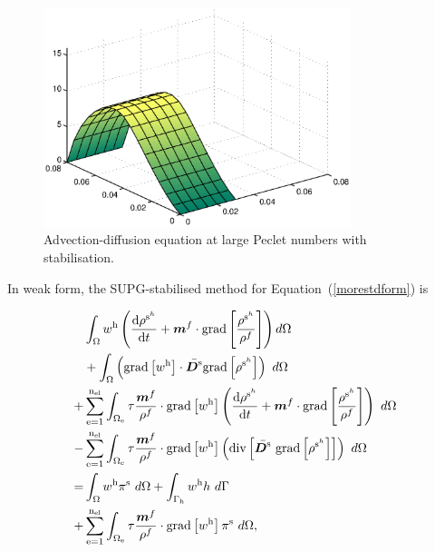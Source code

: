 \begin{figure}
\centering
\includegraphics[width=0.8\textwidth]
                {images/elucidation/stable-advection.eps}
\caption{Advection-diffusion equation at large Peclet numbers with
  stabilisation.}
\label{ustable-solution}
\end{figure}


In weak form, the SUPG-stabilised method for
Equation~(\ref{morestdform}) is

\begin{equation}
\begin{split}
&\int_{\Omega} w^{\mathrm{h}} \left(
  \frac{\mathrm{d}\rho^{\mathrm{s}^{h}}}{\mathrm{d}t} +
  \mbox{\boldmath$ m$}^f\cdot\mathrm{grad}\left[\frac{
      \rho^{\mathrm{s}^{h}}}{\rho^f}\right] \right)
  d\Omega\\ &+\int_{\Omega} \left( \mathrm{grad}
  \left[w^{\mathrm{h}}\right] \cdot \bar{\mbox{\boldmath$ D$}^\mathrm{s}} \mathrm{grad}
  \left[ \rho^{\mathrm{s}^{h}}\right] \right)\ d\Omega\\ +&
  \sum_{\mathrm{e}=1}^{\mathrm{n_{el}}} \int_{\Omega_{\mathrm{e}}}
  \tau \frac{\mbox{\boldmath$ m$}^{f}}{\rho^f} \cdot \mathrm{grad} \left[w^{\mathrm{h}}\right] \left(
  \frac{\mathrm{d}\rho^{\mathrm{s}^{h}}}{\mathrm{d}t} +
  \mbox{\boldmath$ m$}^f\cdot\mathrm{grad}\left[\frac{
      \rho^{\mathrm{s}^{h}}}{\rho^f}\right] \right) \ d\Omega\\ -&
  \sum_{\mathrm{e}=1}^{\mathrm{n_{el}}} \int_{\Omega_{\mathrm{e}}}
  \tau \frac{\mbox{\boldmath$ m$}^{f}}{\rho^f} \cdot \mathrm{grad} \left[w^{\mathrm{h}}\right]
  \left(\mathrm{div}\left[\bar{\mbox{\boldmath$ D$}^\mathrm{s}}\ \mathrm{grad} \left[
      \rho^{\mathrm{s}^{h}}\right]\right]\right) \ d\Omega\\ = &
  \int_{\Omega} w^{\mathrm{h}} \pi^\mathrm{s} \ d\Omega +
  \int_{\Gamma_{\mathrm{h}}} w^{\mathrm{h}} h \ d\Gamma\\ +&
  \sum_{\mathrm{e}=1}^{\mathrm{n_{el}}} \int_{\Omega_{\mathrm{e}}}
  \tau \frac{\mbox{\boldmath$ m$}^{f}}{\rho^f} \cdot \mathrm{grad} \left[w^{\mathrm{h}}\right]
  \pi^\mathrm{s} \ d\Omega,
\label{stabilizedmassbal}
\end{split}
\end{equation}

